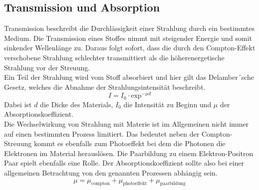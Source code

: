 \subsection{Transmission und Absorption}
Transmission beschreibt die Durchlässigkeit einer Strahlung durch ein bestimmtes Medium. Die Transmission eines Stoffes nimmt mit steigender 
Energie und somit sinkender Wellenlänge zu. Daraus folgt sofort, dass die durch den Compton-Effekt verschobene Strahlung schlechter transmittiert als die
höherenergetische Strahlung vor der Streuung.
\\
Ein Teil der Strahlung wird vom Stoff absorbiert und hier gilt das Delamber´sche Gesetz, welches die Abnahme der Strahlungsintensität beschreibt.
\begin{equation}
\label{eqn:delamber}
I = I_{0} \cdot \text{exp}^{-\mu d}
\end{equation}
Dabei ist $d$ die Dicke des Materials, $I_{0}$ die Intensität zu Beginn und $\mu$ der Absorptionskoeffizient.
\\
Die Wechselwirkung von Strahlung mit Materie ist im Allgemeinen nicht immer auf einen bestimmten Prozess limitiert. Das bedeutet neben der Compton-Streuung kommt
es ebenfalls zum Photoeffekt bei dem die Photonen die Elektronen im Material herauslösen. Die Paarbildung zu einem Elektron-Positron Paar spielt ebenfalls eine Rolle.
Der Absorptionskoeffizient sollte also bei einer allgemeinen Betrachtung von den genannten Prozessen abhängig sein.
\begin{equation*}
\mu = \mu_{\text{compton}} + \mu_{\text{photoeffekt}} + \mu_{\text{paarbildung}}
\end{equation*}


